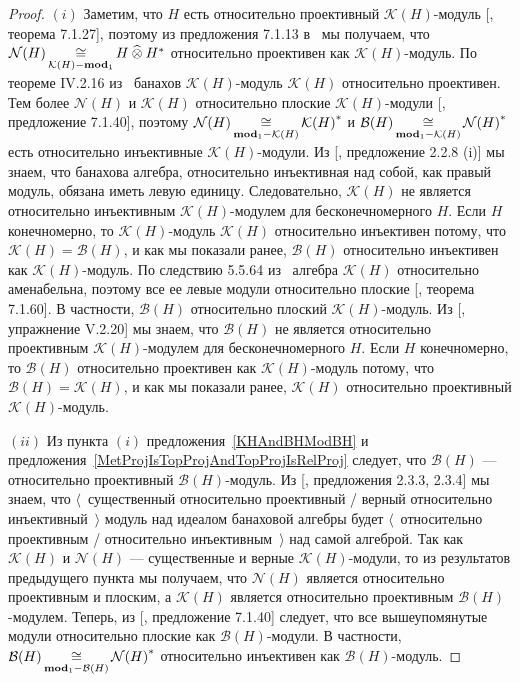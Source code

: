 \begin{proof} $(i)$ Заметим, что $H$ есть относительно проективный
$\mathcal{K}(H)$-модуль [\cite{HelBanLocConvAlg}, теорема 7.1.27], поэтому из
предложения 7.1.13 в~\cite{HelBanLocConvAlg} мы получаем, что
$\mathcal{N}(H)\mathop{\mathbin{\cong}}\limits_{\mathcal{K}(H)-\mathbf{mod}_1}H\mathbin{\widehat{\otimes}} H^*$ относительно
проективен как $\mathcal{K}(H)$-модуль. По теореме IV.2.16
из~\cite{HelHomolBanTopAlg} банахов $\mathcal{K}(H)$-модуль $\mathcal{K}(H)$
относительно проективен. Тем более $\mathcal{N}(H)$ и $\mathcal{K}(H)$
относительно плоские $\mathcal{K}(H)$-модули [\cite{HelBanLocConvAlg},
предложение 7.1.40], поэтому
$\mathcal{N}(H)\mathop{\mathbin{\cong}}\limits_{\mathbf{mod}_1-\mathcal{K}(H)}{\mathcal{K}(H)}^*$ и
$\mathcal{B}(H)\mathop{\mathbin{\cong}}\limits_{\mathbf{mod}_1-\mathcal{K}(H)}{\mathcal{N}(H)}^*$ есть
относительно инъективные $\mathcal{K}(H)$-модули. Из
[\cite{RamsHomPropSemgroupAlg}, предложение 2.2.8  (i)] мы знаем, что банахова
алгебра, относительно инъективная над собой, как правый модуль, обязана иметь
левую единицу. Следовательно, $\mathcal{K}(H)$ не является относительно
инъективным $\mathcal{K}(H)$-модулем для бесконечномерного $H$. Если $H$
конечномерно, то $\mathcal{K}(H)$-модуль $\mathcal{K}(H)$ относительно
инъективен потому, что $\mathcal{K}(H)=\mathcal{B}(H)$, и как мы показали ранее,
$\mathcal{B}(H)$ относительно инъективен как $\mathcal{K}(H)$-модуль. По
следствию 5.5.64 из~\cite{DalBanAlgAutCont} алгебра $\mathcal{K}(H)$
относительно аменабельна, поэтому все ее левые модули относительно плоские
[\cite{HelBanLocConvAlg}, теорема 7.1.60]. В частности, $\mathcal{B}(H)$
относительно плоский $\mathcal{K}(H)$-модуль. Из [\cite{HelHomolBanTopAlg},
упражнение V.2.20] мы знаем, что $\mathcal{B}(H)$ не является относительно
проективным $\mathcal{K}(H)$-модулем для бесконечномерного $H$. Если $H$
конечномерно, то $\mathcal{B}(H)$ относительно проективен как
$\mathcal{K}(H)$-модуль потому, что $\mathcal{B}(H)=\mathcal{K}(H)$, и как мы
показали ранее, $\mathcal{K}(H)$ относительно проективный
$\mathcal{K}(H)$-модуль.

$(ii)$ Из пункта $(i)$ предложения~\ref{KHAndBHModBH} и
предложения~\ref{MetProjIsTopProjAndTopProjIsRelProj} следует, что
$\mathcal{B}(H)$ --- относительно проективный $\mathcal{B}(H)$-модуль. Из
[\cite{RamsHomPropSemgroupAlg}, предложения 2.3.3, 2.3.4] мы знаем, что
$\langle$~существенный относительно проективный / верный относительно
инъективный~$\rangle$ модуль над идеалом банаховой алгебры будет
$\langle$~относительно проективным / относительно инъективным~$\rangle$ над
самой алгеброй. Так как $\mathcal{K}(H)$ и $\mathcal{N}(H)$ --- существенные и
верные $\mathcal{K}(H)$-модули, то из результатов предыдущего пункта мы
получаем, что $\mathcal{N}(H)$ является относительно проективным и плоским, а
$\mathcal{K}(H)$ является относительно проективным  $\mathcal{B}(H)$-модулем.
Теперь, из [\cite{HelBanLocConvAlg}, предложение 7.1.40] следует, что все
вышеупомянутые модули относительно плоские как $\mathcal{B}(H)$-модули. В
частности, 
$\mathcal{B}(H)\mathop{\mathbin{\cong}}\limits_{\mathbf{mod}_1-\mathcal{B}(H)}{\mathcal{N}(H)}^*$
относительно инъективен как $\mathcal{B}(H)$-модуль.
\end{proof}

